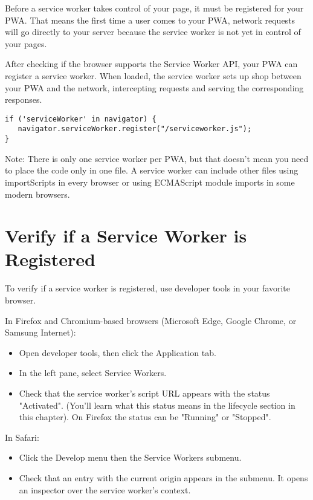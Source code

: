 \documentclass{article}
\begin{document}
Before a service worker takes control of your page, it must be registered for your PWA. That means the first time a user comes to your PWA, network requests will go directly to your server because the service worker is not yet in control of your pages.

After checking if the browser supports the Service Worker API, your PWA can register a service worker. When loaded, the service worker sets up shop between your PWA and the network, intercepting requests and serving the corresponding responses.

\begin{verbatim}
if ('serviceWorker' in navigator) {
   navigator.serviceWorker.register("/serviceworker.js");
}
\end{verbatim}

Note: There is only one service worker per PWA, but that doesn't mean you need to place the code only in one file. A service worker can include other files using importScripts in every browser or using ECMAScript module imports in some modern browsers.

\section*{Verify if a Service Worker is Registered}

To verify if a service worker is registered, use developer tools in your favorite browser.

In Firefox and Chromium-based browsers (Microsoft Edge, Google Chrome, or Samsung Internet):
\begin{itemize}
    \item Open developer tools, then click the Application tab.
    \item In the left pane, select Service Workers.
    \item Check that the service worker's script URL appears with the status "Activated". (You'll learn what this status means in the lifecycle section in this chapter). On Firefox the status can be "Running" or "Stopped".
\end{itemize}

In Safari:
\begin{itemize}
    \item Click the Develop menu then the Service Workers submenu.
    \item Check that an entry with the current origin appears in the submenu. It opens an inspector over the service worker's context.
\end{itemize}
\end{document}
